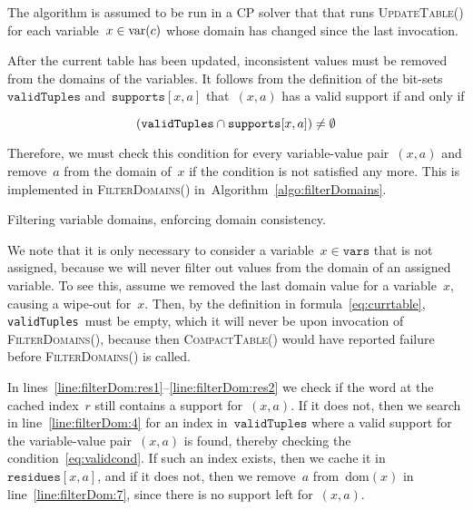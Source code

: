 \documentclass[a4paper,11pt]{article}
\theoremstyle{definition}
\newcommand{\Algoref}[1]{Algorithm~\ref{#1}}
\newcommand{\Lineref}[1]{Line~\ref{#1}}
\newcommand{\linesref}[2]{lines~\ref{#1}--\ref{#2}}
\newcommand{\Dom}[1]{\text{dom}({#1})}
\newcommand{\CurrTable}{\texttt{validTuples}}
\newcommand{\Supports}{\texttt{supports}}
\newcommand{\Residues}{\texttt{residues}}
\newcommand{\Vars}{\texttt{vars}}
\def\CompactTable{\textsc{Compact\-Table}}
\def\UpdateTable{\textsc{Update\-Table}}
\def\FilterDomains{\textsc{Filter\-Domains}}
\numberwithin{equation}{section}
\begin{document}
  The algorithm is assumed to be run in a CP solver that that runs \UpdateTable()
  for each variable~$x \in \text{var}(c)$ whose domain has changed since the
  last invocation.

  \bigskip

  \begin{sloppypar}
      After the current table has been updated, inconsistent values must be removed
      from the domains of the variables.
      It follows from the definition of the bit-sets~$\CurrTable$ and~$\Supports[x,a]$
      that~$(x,a)$ has a valid support if and only if
    \end{sloppypar}

  \begin{equation}
    \label{eq:validcond}
    (\CurrTable \Inter \Supports[x,a]) \neq \emptyset
  \end{equation}

  Therefore, we must check this condition for every variable-value pair~$(x,a)$ and
  remove~$a$ from the domain of~$x$ if the condition is not satisfied any more.
  This is implemented in \FilterDomains()
  in~\Algoref{algo:filterDomains}.%

  \begin{algorithm}[t]
    \begin{algorithmic}[1]  %
      
    \end{algorithmic}
    \caption{Filtering variable domains, enforcing domain consistency.}
        \label{algo:filterDomains}
  \end{algorithm}


  We note that it is only necessary to
  consider a variable~$x \in \Vars$ that is not assigned,
  because we will never filter out values from the domain of an assigned variable.
  To see this, assume we removed the last domain value for a variable~$x$,
  causing a wipe-out for~$x$. Then, by the definition in formula~\eqref{eq:currtable},
  \CurrTable~must be empty,
  which it will never be upon invocation of \FilterDomains(), because then
  \CompactTable() would have reported failure before \FilterDomains() is called.

  In \linesref{line:filterDom:res1}{line:filterDom:res2} we check if the
  word at the cached index~$\mathit{r}$ still contains a support for~$(x,a)$.
  If it does not, then we search in line~\ref{line:filterDom:4} for
  an index in~$\CurrTable$ where a valid support for the variable-value
  pair~$(x,a)$ is found, thereby checking the condition~\eqref{eq:validcond}.
  If such an index exists, then we cache it in~$\Residues[x,a]$, and
  if it does not, then we remove~$a$ from~$\Dom{x}$ in
  line~\ref{line:filterDom:7}, since there is no support left for~$(x,a)$.
\end{document}
